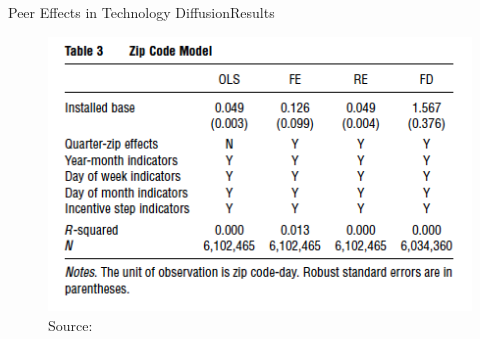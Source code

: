 \documentclass{beamer}
\begin{document}
\begin{frame}{Peer Effects in Technology Diffusion}{Results}
\begin{figure}[h]
\begin{centering}
  \includegraphics[width=\textwidth]{bollinger1}
  \caption{Source: \cite{Bollinger2012}}
   \label{fig:bollinger1}
\end{centering}
\end{figure}
\end{frame}



\end{document}
